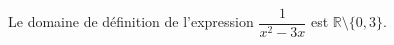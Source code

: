 Le domaine de définition de l'expression $\dfrac{1}{x^2-3x}$ est $\mathbb R \setminus \{0,3\}$.

\begin{reponses}
\end{reponses}


